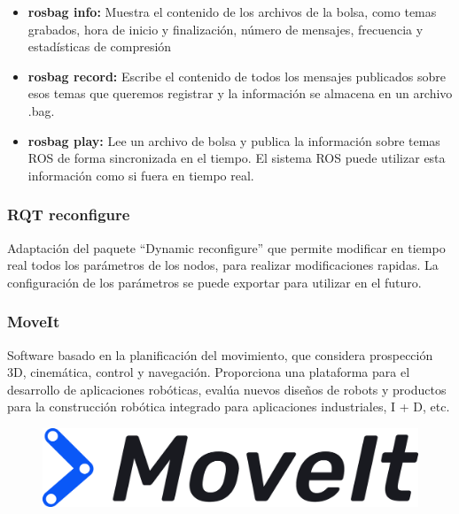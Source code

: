                     \begin{itemize}
                        \item{\textbf{rosbag info:} Muestra el contenido de los archivos de la bolsa, como temas grabados, hora de inicio y finalización, número de mensajes, frecuencia y estadísticas de compresión} 
                        \item{\textbf{rosbag record:} Escribe el contenido de todos los mensajes publicados sobre esos temas que queremos registrar y la información se almacena en un archivo .bag.} 
                        \item{\textbf{rosbag play: } Lee un archivo de bolsa y publica la información sobre temas ROS de forma sincronizada en el tiempo. El sistema ROS puede utilizar esta información como si fuera en tiempo real.} 
                    \end{itemize}

            \subsubsection{RQT reconfigure}
Adaptación del paquete “Dynamic reconfigure” que permite modificar en tiempo real todos los parámetros de los nodos, para realizar modificaciones rapidas. La configuración de los parámetros se puede exportar para utilizar en el futuro.

            \subsubsection{MoveIt }
 Software basado en la planificación del movimiento, que considera prospección 3D, cinemática, control y navegación. Proporciona una plataforma para el desarrollo de aplicaciones robóticas, evalúa nuevos diseños de robots y productos para la construcción robótica integrado para aplicaciones industriales, I + D, etc.
 
             \begin{figure}[htb]
                \centering
                \includegraphics[width=0.7\linewidth]{Main/Chapter3/Images3/herramientas_2.png}
                \caption{}
                \label{f:Cap3_herramientas_2}
            \end{figure}     
            
